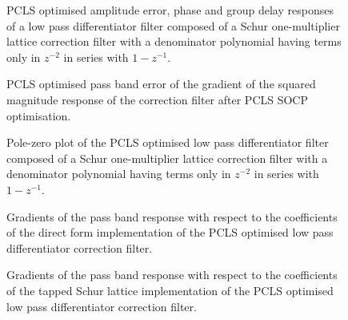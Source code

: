 \documentclass[a4paper,twoside,10pt,english]{article}
\newcommand{\DesignOfSchurLatticeFiltersPdfScale}{1}
\begin{document}
\begin{figure}
\centering
\scalebox{\DesignOfSchurLatticeFiltersPdfScale}{}
\caption{PCLS optimised amplitude error, phase and group delay responses of a
  low pass differentiator filter composed of a Schur one-multiplier lattice
  correction filter with a denominator polynomial having terms only in $z^{-2}$
  in series with $1-z^{-1}$.}
\label{fig:Schur-OneM-lattice-lowpass-differentiator-R2}
\end{figure}

\begin{figure}
\centering
\scalebox{\DesignOfSchurLatticeFiltersPdfScale}{}
\caption{PCLS optimised pass band error of the gradient of the squared magnitude
  response of the correction filter after PCLS SOCP optimisation.}
\label{fig:Schur-OneM-lattice-lowpass-differentiator-R2-dCsqdw-error}
\end{figure}

\begin{figure}
\centering
\scalebox{\DesignOfSchurLatticeFiltersPdfScale}{}
\caption{Pole-zero plot of the PCLS optimised low pass differentiator
  filter composed of a Schur one-multiplier lattice correction filter with a
  denominator polynomial having terms only in $z^{-2}$ in series with $1-z^{-1}$.}
\label{fig:Schur-OneM-lattice-lowpass-differentiator-R2-pz}
\end{figure}

\begin{figure}
\centering
\scalebox{\DesignOfSchurLatticeFiltersPdfScale}{}
\caption{Gradients of the pass band response with respect to the coefficients of
  the direct form implementation of the PCLS optimised low pass differentiator
  correction filter.}
\label{fig:Schur-OneM-lattice-correction-lowpass-differentiator-direct-sens}
\end{figure}

\begin{figure}
\centering
\scalebox{\DesignOfSchurLatticeFiltersPdfScale}{}
\caption{Gradients of the pass band response with respect to the coefficients of
  the tapped Schur lattice implementation of the PCLS optimised low pass
  differentiator correction filter.}
\label{fig:Schur-OneM-lattice-correction-lowpass-differentiator-Schur-sens}
\end{figure}
\end{document}
